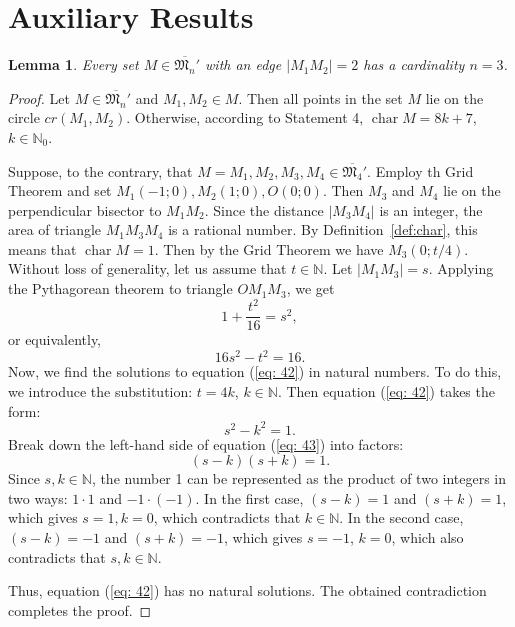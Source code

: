 \documentclass[a4paper,14pt]{article} %
\theoremstyle{plain}
\newtheorem{lemma}[theorem]{Lemma}
\theoremstyle{definition}
\begin{document}
\section{Auxiliary Results}

\begin{lemma}
	\label{lem:no_distance_2}
	Every set $M \in \overline{\mathfrak{M}_n}'$ with an edge $|M_1M_2|=2$ has a cardinality $n=3$.
\end{lemma}


\begin{proof}
	Let $M \in \overline{\mathfrak{M}_n}'$ and $M_1, M_2 \in M$. Then all points in the set $M$ lie on the circle $cr(M_1, M_2)$. Otherwise, according to Statement 4, $\operatorname{char}{M}={8k+7}$, $k\in \mathbb{N}_0$.

	Suppose, to the contrary, that $M={M_1, M_2, M_3, M_4} \in \overline{\mathfrak{M}_4}'$.
	Employ th Grid Theorem and set $M_1(-1;0), M_2(1;0), O(0;0)$.
	Then $M_3$ and $M_4$ lie on the perpendicular bisector to $M_1M_2$.
	Since the distance $|M_3M_4|$ is an integer, the area of triangle $M_1M_3M_4$ is a rational number.
	By Definition~\ref{def:char}, this means that $\operatorname{char}{M}={1}$.
	Then by the Grid Theorem we have $M_3(0;t/4)$. Without loss of generality, let us assume that $t\in\mathbb{N}$. Let $|M_1M_3|=s$. Applying the Pythagorean theorem to triangle $OM_1M_3$, we get
	$$
	1+\frac{t^2}{16}=s^2,
	$$
	or equivalently,
	\begin{equation}
	\label{eq: 42}
	16s^2-t^2=16.
	\end{equation}
	Now, we find the solutions to equation (\ref{eq: 42}) in natural numbers.
	To do this, we introduce the substitution: $t=4k$, $k\in\mathbb{N}$.
	Then equation (\ref{eq: 42}) takes the form:
	\begin{equation}
	\label{eq: 43}
	s^2-k^2=1.
	\end{equation}
	Break down the left-hand side of equation (\ref{eq: 43}) into factors:
	\begin{equation}
	\label{eq: 44}
	(s-k)(s+k)=1.
	\end{equation}
	Since $s,k\in\mathbb{N}$, the number 1 can be represented as the product of two integers in two ways: $1\cdot1$ and $-1\cdot(-1)$. In the first case, $(s-k)=1$ and $(s+k)=1$, which gives $s=1,k=0$, which contradicts that $k\in\mathbb{N}$.
	In the second case, $(s-k)=-1$ and $(s+k)=-1$, which gives $s=-1$, $k=0$, which also contradicts that $s,k\in\mathbb{N}$.

	Thus, equation (\ref{eq: 42}) has no natural solutions.
	The obtained contradiction completes the proof.
\end{proof}
\end{document}
